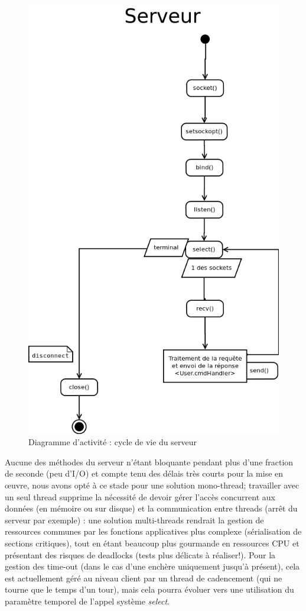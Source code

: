 \documentclass[a4paper,titlepage]{scrreprt}
\begin{document}
    \begin{figure}[H]
    \center
    \includegraphics[scale=0.4]{uml/Serveur.png}
    \caption{Diagramme d'activité : cycle de vie du serveur} \label{diag-serveur}
    \end{figure}
Aucune des méthodes du serveur n'étant bloquante pendant plus d'une fraction de seconde (peu d'I/O) et compte tenu des délais très courts pour la mise en œuvre, nous avons opté à ce stade pour une solution mono-thread;
travailler avec un seul thread supprime la nécessité de devoir gérer l'accès concurrent aux données (en mémoire ou sur disque) et la communication entre threads (arrêt du serveur par exemple) :
une solution multi-threads rendrait la gestion de ressources communes par les fonctions applicatives plus complexe (sérialisation de sections critiques), 
tout en étant beaucoup plus gourmande en ressources CPU et présentant des risques de deadlocks (tests plus délicats à réaliser!). 
Pour la gestion des time-out (dans le cas d'une enchère uniquement jusqu'à présent), 
cela est actuellement géré au niveau client par un thread de cadencement (qui ne tourne que le temps d'un tour),
mais cela pourra évoluer vers une utilisation du paramètre temporel de l'appel système \emph{select}.
\end{document}
